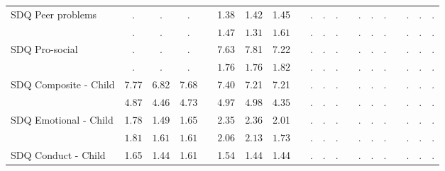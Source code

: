 \begin{landscape}
\begin{center}
{\begin{longtable}{L{5cm} c c c p{.5cm} c c c p{.5cm} c c c p{.5cm} c c c p{.5cm} c c c}
SDQ Peer problems & . &         . &         . & &      1.38 &      1.42 &      1.45 & &         . &         . &         . & &         . &         . &         . & &         . &         . &         . \\*
& $\mathit{        .}$ & $\mathit{        .}$ & $\mathit{        .}$ & & $\mathit{     1.47}$ & $\mathit{     1.31}$ & $\mathit{     1.61}$ & & $\mathit{        .}$ & $\mathit{        .}$ & $\mathit{        .}$ & & $\mathit{        .}$ & $\mathit{        .}$ & $\mathit{        .}$ & & $\mathit{        .}$ & $\mathit{        .}$ & $\mathit{        .}$ \\[1.6em]
SDQ Pro-social & . &         . &         . & &      7.63 &      7.81 &      7.22 & &         . &         . &         . & &         . &         . &         . & &         . &         . &         . \\*
& $\mathit{        .}$ & $\mathit{        .}$ & $\mathit{        .}$ & & $\mathit{     1.76}$ & $\mathit{     1.76}$ & $\mathit{     1.82}$ & & $\mathit{        .}$ & $\mathit{        .}$ & $\mathit{        .}$ & & $\mathit{        .}$ & $\mathit{        .}$ & $\mathit{        .}$ & & $\mathit{        .}$ & $\mathit{        .}$ & $\mathit{        .}$ \\[1.6em]
SDQ Composite - Child & 7.77 &      6.82 &      7.68 & &      7.40 &      7.21 &      7.21 & &         . &         . &         . & &         . &         . &         . & &         . &         . &         . \\*
& $\mathit{     4.87}$ & $\mathit{     4.46}$ & $\mathit{     4.73}$ & & $\mathit{     4.97}$ & $\mathit{     4.98}$ & $\mathit{     4.35}$ & & $\mathit{        .}$ & $\mathit{        .}$ & $\mathit{        .}$ & & $\mathit{        .}$ & $\mathit{        .}$ & $\mathit{        .}$ & & $\mathit{        .}$ & $\mathit{        .}$ & $\mathit{        .}$ \\[1.6em]
SDQ Emotional - Child & 1.78 &      1.49 &      1.65 & &      2.35 &      2.36 &      2.01 & &         . &         . &         . & &         . &         . &         . & &         . &         . &         . \\*
& $\mathit{     1.81}$ & $\mathit{     1.61}$ & $\mathit{     1.61}$ & & $\mathit{     2.06}$ & $\mathit{     2.13}$ & $\mathit{     1.73}$ & & $\mathit{        .}$ & $\mathit{        .}$ & $\mathit{        .}$ & & $\mathit{        .}$ & $\mathit{        .}$ & $\mathit{        .}$ & & $\mathit{        .}$ & $\mathit{        .}$ & $\mathit{        .}$ \\[1.6em]
SDQ Conduct - Child & 1.65 &      1.44 &      1.61 & &      1.54 &      1.44 &      1.44 & &         . &         . &         . & &         . &         . &         . & &         . &         . &         . \\*

\end{longtable}}
\end{center}
\end{landscape}
